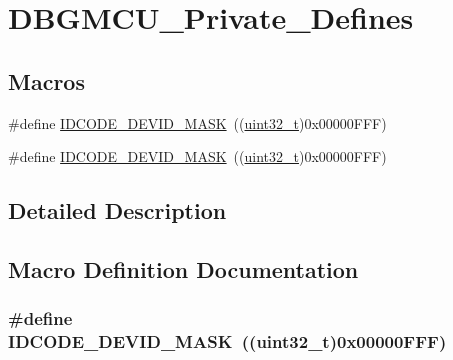\hypertarget{group___d_b_g_m_c_u___private___defines}{}\section{D\+B\+G\+M\+C\+U\+\_\+\+Private\+\_\+\+Defines}
\label{group___d_b_g_m_c_u___private___defines}
\subsection*{Macros}
\begin{DoxyCompactItemize}
\item 
\#define \hyperlink{group___d_b_g_m_c_u___private___defines_gaeeece10cca80f3c632d3d77c3f2917b6}{I\+D\+C\+O\+D\+E\+\_\+\+D\+E\+V\+I\+D\+\_\+\+M\+A\+SK}~((\hyperlink{_p_e___types_8h_a33594304e786b158f3fb30289278f5af}{uint32\+\_\+t})0x00000\+F\+F\+F)
\item 
\#define \hyperlink{group___d_b_g_m_c_u___private___defines_gaeeece10cca80f3c632d3d77c3f2917b6}{I\+D\+C\+O\+D\+E\+\_\+\+D\+E\+V\+I\+D\+\_\+\+M\+A\+SK}~((\hyperlink{_p_e___types_8h_a33594304e786b158f3fb30289278f5af}{uint32\+\_\+t})0x00000\+F\+F\+F)
\end{DoxyCompactItemize}


\subsection{Detailed Description}


\subsection{Macro Definition Documentation}
\subsubsection[{\texorpdfstring{I\+D\+C\+O\+D\+E\+\_\+\+D\+E\+V\+I\+D\+\_\+\+M\+A\+SK}{IDCODE_DEVID_MASK}}]{\setlength{\rightskip}{0pt plus 5cm}\#define I\+D\+C\+O\+D\+E\+\_\+\+D\+E\+V\+I\+D\+\_\+\+M\+A\+SK~(({\bf uint32\+\_\+t})0x00000\+F\+F\+F)}\hypertarget{group___d_b_g_m_c_u___private___defines_gaeeece10cca80f3c632d3d77c3f2917b6}{}\label{group___d_b_g_m_c_u___private___defines_gaeeece10cca80f3c632d3d77c3f2917b6}


